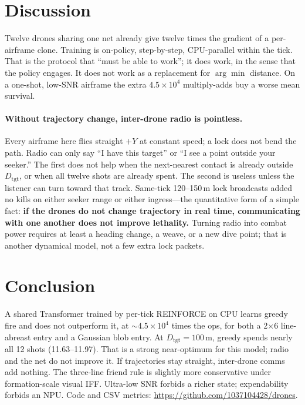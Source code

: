 \documentclass[12pt,a4paper]{article}
\begin{document}
\section{Discussion}

Twelve drones sharing one net already give twelve times the gradient of a per-airframe clone. Training is on-policy, step-by-step, CPU-parallel within the tick. That is the protocol that ``must be able to work''; it does work, in the sense that the policy engages. It does not work as a replacement for $\arg\min$ distance. On a one-shot, low-SNR airframe the extra $4.5\times 10^4$ multiply-adds buy a worse mean survival.

\paragraph{Without trajectory change, inter-drone radio is pointless.}
Every airframe here flies straight $+Y$ at constant speed; a lock does not bend the path. Radio can only say ``I have this target'' or ``I see a point outside your seeker.'' The first does not help when the next-nearest contact is already outside $D_{\mathrm{tgt}}$, or when all twelve shots are already spent. The second is useless unless the listener can turn toward that track. Same-tick 120--150\,m lock broadcasts added no kills on either seeker range or either ingress---the quantitative form of a simple fact: \textbf{if the drones do not change trajectory in real time, communicating with one another does not improve lethality.} Turning radio into combat power requires at least a heading change, a weave, or a new dive point; that is another dynamical model, not a few extra lock packets.

\section{Conclusion}

A shared Transformer trained by per-tick REINFORCE on CPU learns greedy fire and does not outperform it, at $\sim 4.5\times 10^4$ times the ops, for both a 2$\times$6 line-abreast entry and a Gaussian blob entry. At $D_{\mathrm{tgt}}=100\,\mathrm{m}$, greedy spends nearly all 12 shots (11.63--11.97). That is a strong near-optimum for this model; radio and the net do not improve it. If trajectories stay straight, inter-drone comms add nothing. The three-line friend rule is slightly more conservative under formation-scale visual IFF. Ultra-low SNR forbids a richer state; expendability forbids an NPU. Code and CSV metrics: \url{https://github.com/1037104428/drones}.
\end{document}
